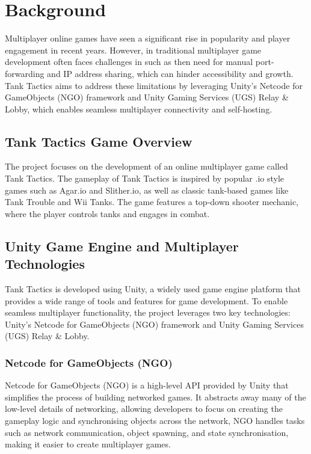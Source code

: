 
\section{Background}
\label{sec:into_back}
Multiplayer online games have seen a significant rise in popularity and player engagement in recent years. However, in traditional multiplayer game development often faces challenges in such as then need for manual port-forwarding and IP address sharing, which can hinder accessibility and growth. Tank Tactics aims to address these limitations by leveraging Unity's Netcode for GameObjects (NGO) framework and Unity Gaming Services (UGS) Relay \& Lobby, which enables seamless multiplayer connectivity and self-hosting.
\subsection{Tank Tactics Game Overview}
The project focuses on the development of an online multiplayer game called Tank Tactics. The gameplay of Tank Tactics is inspired by popular .io style games such as Agar.io and Slither.io, as well as classic tank-based games like Tank Trouble and Wii Tanks. The game features a top-down shooter mechanic, where the player controls tanks and engages in combat.
\subsection{Unity Game Engine and Multiplayer Technologies}
Tank Tactics is developed using Unity, a widely used game engine platform that provides a wide range of tools and features for game development. To enable seamless multiplayer functionality, the project leverages two key technologies: Unity's Netcode for GameObjects (NGO) framework and Unity Gaming Services (UGS) Relay \& Lobby.
\subsubsection{Netcode for GameObjects (NGO)}
Netcode for GameObjects (NGO) is a high-level API provided by Unity that simplifies the process of building networked games. It abstracts away many of the low-level details of networking, allowing developers to focus on creating the gameplay logic and synchronising objects across the network, NGO handles tasks such as network communication, object spawning, and state synchronisation, making it easier to create multiplayer games.
